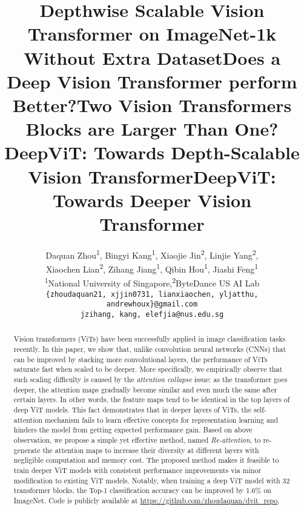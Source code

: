 \documentclass[10pt,twocolumn,letterpaper]{article}
\newcommand{\nameofatten}{Re-attention}
\begin{document}
\title{Depthwise Scalable Vision Transformer on ImageNet-1k Without Extra Dataset}
\title{Does a Deep Vision Transformer perform Better?}
\title{Two Vision Transformers Blocks are Larger Than One? }
\title{DeepViT: Towards Depth-Scalable Vision Transformer}
\title{DeepViT: Towards Deeper Vision Transformer}



\author{Daquan Zhou\textsuperscript{1},
Bingyi Kang\textsuperscript{1},
Xiaojie Jin\textsuperscript{2},
Linjie Yang\textsuperscript{2},\\
Xiaochen Lian\textsuperscript{2},
Zihang Jiang\textsuperscript{1},
Qibin Hou\textsuperscript{1},
Jiashi Feng\textsuperscript{1} \\
\textsuperscript{1}National University of Singapore,\quad \textsuperscript{2}ByteDance US AI Lab  \\
\texttt{\small {\{zhoudaquan21, xjjin0731, lianxiaochen, yljatthu, andrewhoux\}}@gmail.com}
\\
\texttt{\small{jzihang, kang, elefjia}@nus.edu.sg}
}

\maketitle
\ificcvfinal\thispagestyle{empty}\fi

\begin{abstract}
Vision transformers (ViTs) have been successfully applied in image classification tasks recently.
In this paper, we show that, unlike convolution neural networks (CNNs) that can be improved by
stacking more convolutional layers, the performance of ViTs saturate fast when scaled to be deeper.
More specifically, we empirically observe that such scaling difficulty is caused by the \emph{attention collapse} issue: as the transformer goes deeper, 
the attention maps gradually become similar and even much the same after certain layers. 
In other words, the feature maps tend to be identical in the top layers of
deep ViT models. This fact demonstrates that in deeper layers of ViTs, the self-attention mechanism fails to learn effective concepts for representation learning and hinders the model from getting expected performance gain.
Based on above observation, we propose a simple yet effective method, named \emph{\nameofatten{}}, to re-generate the attention maps to increase their diversity at different layers with negligible computation and memory cost. 
The proposed method makes it feasible to train deeper ViT models with consistent performance improvements
via minor modification to existing ViT models.
Notably, when training a deep ViT model with 32 transformer blocks, the Top-1 classification
accuracy  can be improved by 1.6\% on ImageNet. 
Code is publicly available at \url{https://github.com/zhoudaquan/dvit_repo}.
   
   
\end{abstract}
\end{document}
